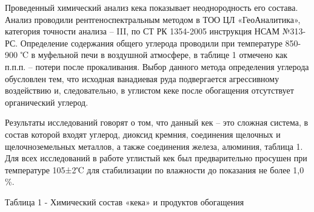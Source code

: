 Проведенный химический анализ кека показывает неоднородность его
состава. Анализ проводили рентгеноспектральным методом в ТОО ЦЛ
«ГеоАналитика», категория точности анализа -- III, по СТ РК 1354-2005
инструкция НСАМ №313-РС. Определение содержания общего углерода
проводили при температуре 850-900 ℃ в муфельной печи в воздушной
атмосфере, в таблице 1 отмечено как п.п.п. -- потери после прокаливания.
Выбор данного метода определения углерода обусловлен тем, что исходная
ванадиевая руда подвергается агрессивному воздействию и, следовательно,
в углистом кеке после обогащения отсутствует органический углерод.

Результаты исследований говорят о том, что данный кек -- это сложная
система, в состав которой входят уг­лерод, диоксид кремния, соединения
щелочных и щелочноземельных ме­тал­лов, а также соединения железа,
алюминия, таблица 1. Для всех исследований в работе углистый кек был
предварительно просушен при температуре 105±2℃ для стабилизации по
влажности до показания не более 1,0 \%.

Таблица 1 - Химический состав «кека» и продуктов обогащения

